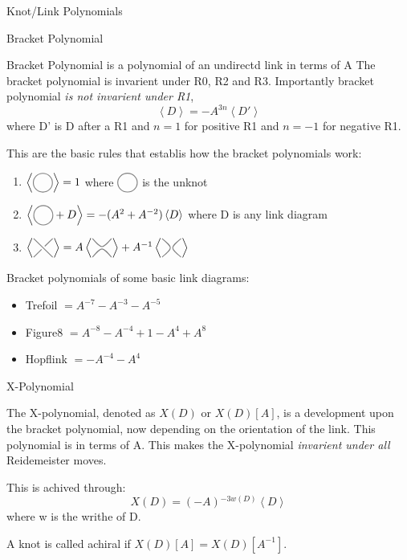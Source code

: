 \documentclass[12pt, letterpaper]{article}
\newcommand{\KP}[1]{%
  \begin{tikzpicture}[baseline=-\dimexpr\fontdimen22\textfont2\relax]
  #1
  \end{tikzpicture}%
}
\newcommand{\Circle}{%
  \KP{\filldraw[color=gray, fill=none, thick] circle (0.3);}%
}
\newcommand{\UCross}{%
  \KP{
    \draw[color=gray,thick] (-0.3,0.3) -- (0.3,-0.3);
    \draw[color=gray,thick] (-0.3,-0.3) -- (-0.05,-0.05);
    \draw[color=gray,thick] (0.05,0.05) -- (0.3,0.3);
  }%
}
\newcommand{\RSmooth}{%
  \KP{%
    \draw[color=gray,thick] (-0.3,0.3)..controls (0,-0.05).. (0.3,0.3);
    \draw[color=gray,thick] (-0.3,-0.3)..controls (0,0.05).. (0.3,-0.3);
  }%
}
\newcommand{\LSmooth}{%
  \KP{%
    \draw[color=gray,thick] (-0.3,-0.3)..controls (0.05,0).. (-0.3,0.3);
    \draw[color=gray,thick] (0.3,-0.3)..controls (-0.05,0).. (0.3,0.3);
  }%
}
\begin{document}
\begin{section}{Knot/Link Polynomials}

  \begin{subsection}{Bracket Polynomial}

    Bracket Polynomial is a polynomial of an undirectd link in terms of A
    The bracket polynomial is invarient under R0, R2 and R3.
    Importantly bracket polynomial \emph{is not invarient under R1},
    \[\left\langle D \right\rangle = -A^{3n} \left\langle D' \right\rangle\]
    where D' is D after a R1 and \(n=1\) for positive R1 and \(n=-1\) for
    negative R1.

    This are the basic rules that establis how the bracket polynomials work:
    \begin{enumerate}
      \item \(\left\langle \Circle \right\rangle = 1\) where \(\Circle\) is the
            unknot
      \item \(\left\langle \Circle + D \right\rangle =- (A^{2} + A^{-2}) \left\langle D\right\rangle\)
            where D is any link diagram
      \item
            \(\left\langle \UCross \right\rangle = A \left\langle \RSmooth \right\rangle + A^{-1} \left\langle \LSmooth \right\rangle\)
    \end{enumerate}

    Bracket polynomials of some basic link diagrams:
    \begin{itemize}
      \item Trefoil \(= A^{-7} - A^{-3} - A^{-5}\)
      \item Figure8 \(= A^{-8} - A^{-4} + 1 - A^{4} + A^{8}\)
      \item Hopflink \(= -A^{-4} - A^{4}\)
    \end{itemize}

  \end{subsection}

  \begin{subsection}{X-Polynomial}
    
    The X-polynomial, denoted as \(X(D)\) or \(X(D)[A]\),
    is a development upon the bracket polynomial, now depending on the
    orientation of the link.
    This polynomial is in terms of A.
    This makes the X-polynomial \emph{invarient under all} Reidemeister moves.

    This is achived through: \[X(D) = (-A){}^{-3w(D)} \left\langle D \right\rangle\]
    where w is the writhe of D.

    A knot is called achiral if \(X(D)[A] = X(D)[A^{-1}]\).


\end{subsection}
\end{section}
\end{document}
